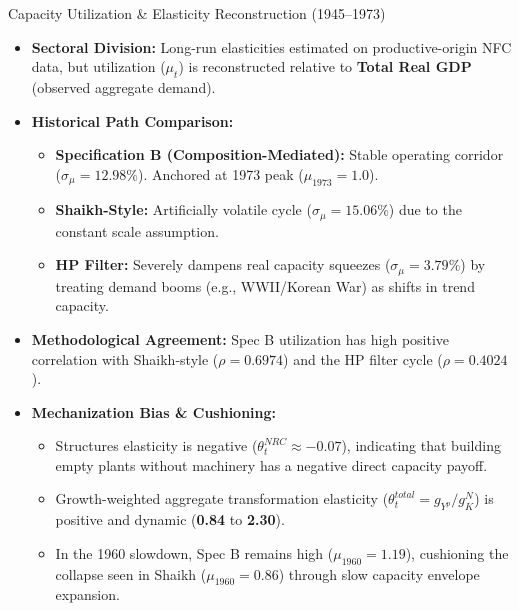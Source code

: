 \documentclass[10pt]{beamer}
\begin{document}
\begin{frame}{Capacity Utilization \& Elasticity Reconstruction (1945--1973)}
  \begin{itemize}
    \item \textbf{Sectoral Division:} Long-run elasticities estimated on productive-origin NFC data, but utilization ($\mu_t$) is reconstructed relative to \textbf{Total Real GDP} (observed aggregate demand).
    \item \textbf{Historical Path Comparison:}
      \begin{itemize}
        \item \textbf{Specification B (Composition-Mediated):} Stable operating corridor ($\sigma_{\mu} = 12.98\%$). Anchored at 1973 peak ($\mu_{1973}=1.0$).
        \item \textbf{Shaikh-Style:} Artificially volatile cycle ($\sigma_{\mu} = 15.06\%$) due to the constant scale assumption.
        \item \textbf{HP Filter:} Severely dampens real capacity squeezes ($\sigma_{\mu} = 3.79\%$) by treating demand booms (e.g., WWII/Korean War) as shifts in trend capacity.
      \end{itemize}
    \item \textbf{Methodological Agreement:} Spec B utilization has high positive correlation with Shaikh-style ($\rho = 0.6974$) and the HP filter cycle ($\rho = 0.4024$).
    \item \textbf{Mechanization Bias \& Cushioning:}
      \begin{itemize}
        \item Structures elasticity is negative ($\theta^{NRC}_t \approx -0.07$), indicating that building empty plants without machinery has a negative direct capacity payoff.
        \item Growth-weighted aggregate transformation elasticity ($\theta^{total}_t = g_{Y^p} / g_K^N$) is positive and dynamic (\textbf{0.84} to \textbf{2.30}).
        \item In the 1960 slowdown, Spec B remains high ($\mu_{1960} = 1.19$), cushioning the collapse seen in Shaikh ($\mu_{1960} = 0.86$) through slow capacity envelope expansion.
      \end{itemize}
  \end{itemize}
\end{frame}
\end{document}
